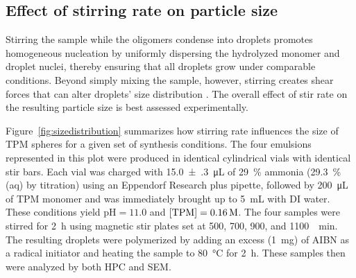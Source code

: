 \documentclass[journal=langd5,manuscript=article]{achemso}
\begin{document}
\subsection{Effect of stirring rate on particle size}
\label{sec:stir}

Stirring the sample while the oligomers condense into droplets promotes
homogeneous nucleation by uniformly dispersing the hydrolyzed monomer
and droplet nuclei, thereby ensuring that all droplets grow under
comparable conditions.
Beyond simply mixing the sample, however, stirring creates shear
forces \cite{halasz2007vortex} that can alter droplets' size
distribution \cite{oles1992shear,eggersdorfer2010fragmentation,yeung2003shear}.
The overall effect of stir rate on the resulting particle size
is best assessed experimentally.

Figure~\ref{fig:sizedistribution} summarizes how
stirring rate influences the size
of TPM spheres for a given set of synthesis conditions.
The four emulsions represented in this plot
were produced in identical cylindrical 
vials with identical stir bars. 
Each vial was charged with
\SI{15.0(3)}{\micro\liter} of \SI{29}{\percent} ammonia 
(\SI{29.3}{\percent} (aq) by  titration) 
using an Eppendorf Research plus pipette, followed by
\SI{200}{\micro\liter} of TPM monomer and was immediately
brought up to \SI{5}{\milli\liter} with DI water.
These conditions yield $\text{pH} = \num{11.0}$ and
$[\ce{TPM}] = \SI{0.16}{M}$.
The four samples were stirred for \SI{2}{\hour}
using magnetic stir plates set at \num{500}, \num{700}, \num{900}, and
\SI{1100}{\per\minute}. 
The resulting droplets were polymerized by adding an excess (\SI{1}{mg}) of AIBN
as a radical initiator and
heating the sample to \SI{80}{\celsius} for \SI{2}{\hour}.
These samples then were analyzed by both HPC and SEM.
\end{document}
